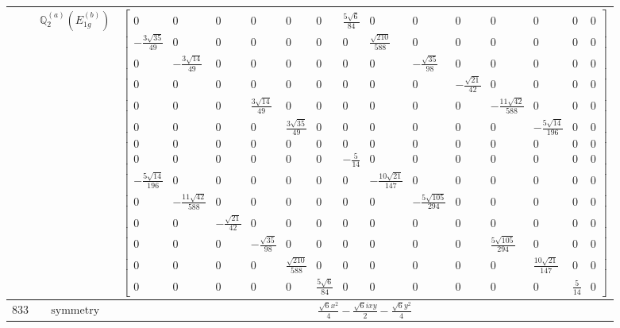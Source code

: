 \documentclass[fleqn,8pt,landscape]{jsarticle}
\begin{document}
\begin{longtable}{ccc}
$  $ & $ \mathbb{Q}_{2}^{(a)}(E_{1g}^{(b)}) $ & $ \begin{bmatrix} 0 & 0 & 0 & 0 & 0 & 0 & \frac{5 \sqrt{6}}{84} & 0 & 0 & 0 & 0 & 0 & 0 & 0 \\ - \frac{3 \sqrt{35}}{49} & 0 & 0 & 0 & 0 & 0 & 0 & \frac{\sqrt{210}}{588} & 0 & 0 & 0 & 0 & 0 & 0 \\ 0 & - \frac{3 \sqrt{14}}{49} & 0 & 0 & 0 & 0 & 0 & 0 & - \frac{\sqrt{35}}{98} & 0 & 0 & 0 & 0 & 0 \\ 0 & 0 & 0 & 0 & 0 & 0 & 0 & 0 & 0 & - \frac{\sqrt{21}}{42} & 0 & 0 & 0 & 0 \\ 0 & 0 & 0 & \frac{3 \sqrt{14}}{49} & 0 & 0 & 0 & 0 & 0 & 0 & - \frac{11 \sqrt{42}}{588} & 0 & 0 & 0 \\ 0 & 0 & 0 & 0 & \frac{3 \sqrt{35}}{49} & 0 & 0 & 0 & 0 & 0 & 0 & - \frac{5 \sqrt{14}}{196} & 0 & 0 \\ 0 & 0 & 0 & 0 & 0 & 0 & 0 & 0 & 0 & 0 & 0 & 0 & 0 & 0 \\ 0 & 0 & 0 & 0 & 0 & 0 & - \frac{5}{14} & 0 & 0 & 0 & 0 & 0 & 0 & 0 \\ - \frac{5 \sqrt{14}}{196} & 0 & 0 & 0 & 0 & 0 & 0 & - \frac{10 \sqrt{21}}{147} & 0 & 0 & 0 & 0 & 0 & 0 \\ 0 & - \frac{11 \sqrt{42}}{588} & 0 & 0 & 0 & 0 & 0 & 0 & - \frac{5 \sqrt{105}}{294} & 0 & 0 & 0 & 0 & 0 \\ 0 & 0 & - \frac{\sqrt{21}}{42} & 0 & 0 & 0 & 0 & 0 & 0 & 0 & 0 & 0 & 0 & 0 \\ 0 & 0 & 0 & - \frac{\sqrt{35}}{98} & 0 & 0 & 0 & 0 & 0 & 0 & \frac{5 \sqrt{105}}{294} & 0 & 0 & 0 \\ 0 & 0 & 0 & 0 & \frac{\sqrt{210}}{588} & 0 & 0 & 0 & 0 & 0 & 0 & \frac{10 \sqrt{21}}{147} & 0 & 0 \\ 0 & 0 & 0 & 0 & 0 & \frac{5 \sqrt{6}}{84} & 0 & 0 & 0 & 0 & 0 & 0 & \frac{5}{14} & 0 \end{bmatrix} $ \\ \hline
$ 833 $ & $ \text{symmetry} $ & $ \frac{\sqrt{6} x^{2}}{4} - \frac{\sqrt{6} i x y}{2} - \frac{\sqrt{6} y^{2}}{4} $ \\

\end{longtable}
\end{document}
